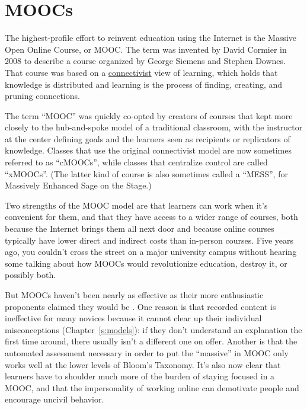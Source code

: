 \section{MOOCs}\label{s:online-moocs}

The highest-profile effort to reinvent education using the Internet is
the Massive Open Online Course, or MOOC. The term was invented by
David Cormier in 2008 to describe a course organized by George Siemens
and Stephen Downes. That course was based on a
\protect\hyperlink{g:connectivism}{connectivist} view of learning, which holds that
knowledge is distributed and learning is the process of finding,
creating, and pruning connections.

The term ``MOOC'' was quickly co-opted by creators of courses that kept
more closely to the hub-and-spoke model of a traditional classroom, with
the instructor at the center defining goals and the learners seen as
recipients or replicators of knowledge. Classes that use the original
connectivist model are now sometimes referred to as ``cMOOCs'', while
classes that centralize control are called ``xMOOCs''. (The latter kind of
course is also sometimes called a ``MESS'', for Massively Enhanced Sage on
the Stage.)

Two strengths of the MOOC model are that learners can work when it's
convenient for them, and that they have access to a wider range of
courses, both because the Internet brings them all next door and because
online courses typically have lower direct and indirect costs than
in-person courses. Five years ago, you couldn't cross the street on a
major university campus without hearing some talking about how MOOCs
would revolutionize education, destroy it, or possibly both.

But MOOCs haven't been nearly as effective as their more enthusiastic
proponents claimed they would be \cite{Ubel2017}. One reason is that
recorded content is ineffective for many novices because it cannot clear
up their individual misconceptions (Chapter~\ref{s:models}): if they
don't understand an explanation the first time around, there usually
isn't a different one on offer. Another is that the automated assessment
necessary in order to put the ``massive'' in MOOC only works well at the
lower levels of Bloom's Taxonomy. It's also now clear that learners have
to shoulder much more of the burden of staying focused in a MOOC, and
that the impersonality of working online can demotivate people and
encourage uncivil behavior.

